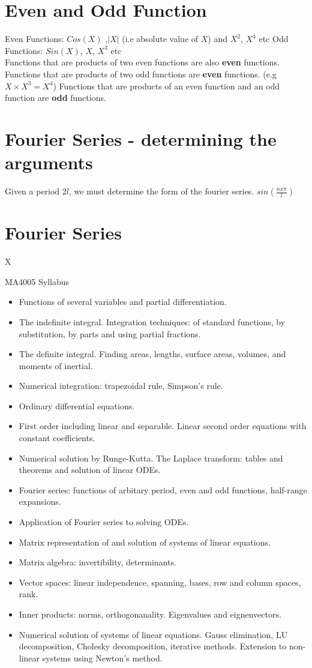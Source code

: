 \documentclass[12pt, a4paper]{article}
\begin{document}
\section{Even and Odd Function}
Even Functions: $Cos(X)$ ,$|X|$ (i.e absolute value of $X$) and
$X^2$, $X^4$ etc
\newline
Odd Functions: $Sin(X)$, $X$, $X^3$ etc
\\
Functions that are products of two even functions are also
\textbf{even} functions.
\newline
Functions that are products of two odd functions are
\textbf{even} functions. (e.g $X \times X^3 = X^4$)
\newline
Functions that are products of an even function and an
odd function are \textbf{odd} functions.

\section{Fourier Series - determining the arguments}
Given a period $2l$, we must determine the form of the fourier
series. $sin( \frac{n x \pi}{l})$
\section{Fourier Series}
X

MA4005 Syllabus
\begin{itemize}
\item Functions of several variables and partial differentiation.
\item The indefinite integral. Integration techniques: of standard functions, by substitution, by parts and using partial fractions.
\item The definite integral. Finding areas, lengths, surface areas, volumes, and moments of inertial.
\item Numerical integration: trapezoidal rule, Simpson's rule.
\item Ordinary differential equations.
\item First order including linear and separable. Linear second order equations with constant coefficients.
\item Numerical solution by Runge-Kutta. The Laplace transform: tables and theorems and solution of linear ODEs.
\item Fourier series: functions of arbitary period, even and odd functions, half-range expansions.
\item Application of Fourier series to solving ODEs.
\item Matrix representation of and solution of systems of linear equations.
\item Matrix algebra: invertibility, determinants.
\item Vector spaces: linear independence, spanning, bases, row and column spaces, rank.
\item Inner products: norms, orthogonanality. Eigenvalues and eignenvectors.
\item Numerical solution of systems of linear equations. Gauss elimination, LU decomposition, Cholesky decomposition,
iterative methods. Extension to non-linear systems using Newton's method.
\end{itemize}
\end{document}
